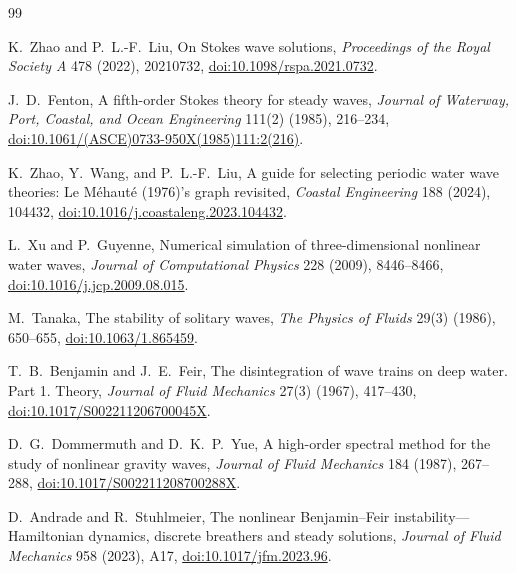 \documentclass[11pt]{article}
\begin{document}
\begin{thebibliography}{99}

K.~Zhao and P.~L.-F.~Liu,
\newblock On Stokes wave solutions,
\newblock \emph{Proceedings of the Royal Society A} 478 (2022), 20210732,
\href{https://doi.org/10.1098/rspa.2021.0732}
{doi:10.1098/rspa.2021.0732}.

J.~D.~Fenton,
\newblock A fifth-order Stokes theory for steady waves,
\newblock \emph{Journal of Waterway, Port, Coastal, and Ocean Engineering}
111(2) (1985), 216--234,
\href{https://doi.org/10.1061/(ASCE)0733-950X(1985)111:2(216)}
{doi:10.1061/(ASCE)0733-950X(1985)111:2(216)}.

K.~Zhao, Y.~Wang, and P.~L.-F.~Liu,
\newblock A guide for selecting periodic water wave theories:
Le M\'ehaut\'e (1976)'s graph revisited,
\newblock \emph{Coastal Engineering} 188 (2024), 104432,
\href{https://doi.org/10.1016/j.coastaleng.2023.104432}
{doi:10.1016/j.coastaleng.2023.104432}.

L.~Xu and P.~Guyenne,
\newblock Numerical simulation of three-dimensional nonlinear water waves,
\newblock \emph{Journal of Computational Physics} 228 (2009), 8446--8466,
\href{https://doi.org/10.1016/j.jcp.2009.08.015}
{doi:10.1016/j.jcp.2009.08.015}.

M.~Tanaka,
\newblock The stability of solitary waves,
\newblock \emph{The Physics of Fluids} 29(3) (1986), 650--655,
\href{https://doi.org/10.1063/1.865459}
{doi:10.1063/1.865459}.

T.~B.~Benjamin and J.~E.~Feir,
\newblock The disintegration of wave trains on deep water. Part 1. Theory,
\newblock \emph{Journal of Fluid Mechanics} 27(3) (1967), 417--430,
\href{https://doi.org/10.1017/S002211206700045X}
{doi:10.1017/S002211206700045X}.

D.~G.~Dommermuth and D.~K.~P.~Yue,
\newblock A high-order spectral method for the study of nonlinear gravity
waves,
\newblock \emph{Journal of Fluid Mechanics} 184 (1987), 267--288,
\href{https://doi.org/10.1017/S002211208700288X}
{doi:10.1017/S002211208700288X}.

D.~Andrade and R.~Stuhlmeier,
\newblock The nonlinear Benjamin--Feir instability---Hamiltonian dynamics,
discrete breathers and steady solutions,
\newblock \emph{Journal of Fluid Mechanics} 958 (2023), A17,
\href{https://doi.org/10.1017/jfm.2023.96}
{doi:10.1017/jfm.2023.96}.


\end{thebibliography}
\end{document}
